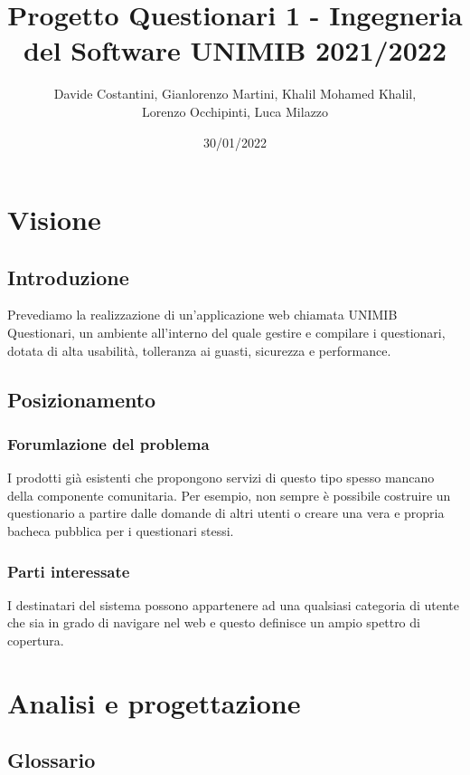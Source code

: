 \documentclass[12pt]{article}
\title{ Progetto Questionari 1 - Ingegneria del Software  UNIMIB 2021/2022} %
\author{Davide Costantini, Gianlorenzo Martini, Khalil Mohamed Khalil, \\ Lorenzo Occhipinti, Luca Milazzo} %
\date{30/01/2022} %
\begin{document}
\maketitle %
\newpage
\tableofcontents \newpage
\section{Visione}
\subsection{Introduzione}
Prevediamo la realizzazione di un'applicazione web chiamata UNIMIB Questionari, un ambiente all'interno del quale gestire e compilare i questionari, dotata di alta usabilità, tolleranza ai guasti, sicurezza e performance.
\subsection{Posizionamento}
\subsubsection{Forumlazione del problema}
I prodotti già esistenti che propongono servizi di questo tipo spesso mancano della componente comunitaria. Per esempio, non sempre è possibile costruire un questionario a partire dalle domande di altri utenti o creare una vera e propria bacheca pubblica per i questionari stessi.
\subsubsection{Parti interessate}
I destinatari del sistema possono appartenere ad una qualsiasi categoria di utente che sia in grado di navigare nel web e questo definisce un ampio spettro di copertura.

\section{Analisi e progettazione}
\subsection{Glossario}
\end{document}
